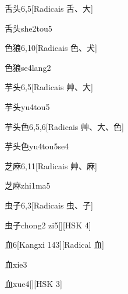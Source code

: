 \begin{entry}{舌头}{6,5}[Radicais ⾆、⼤]
  \begin{phonetics}{舌头}{she2tou5}
  \end{phonetics}
\end{entry}

\begin{entry}{色狼}{6,10}[Radicais ⾊、⽝]
  \begin{phonetics}{色狼}{se4lang2}
  \end{phonetics}
\end{entry}

\begin{entry}{芋头}{6,5}[Radicais ⾋、⼤]
  \begin{phonetics}{芋头}{yu4tou5}
  \end{phonetics}
\end{entry}

\begin{entry}{芋头色}{6,5,6}[Radicais ⾋、⼤、⾊]
  \begin{phonetics}{芋头色}{yu4tou5se4}
  \end{phonetics}
\end{entry}

\begin{entry}{芝麻}{6,11}[Radicais ⾋、⿇]
  \begin{phonetics}{芝麻}{zhi1ma5}
  \end{phonetics}
\end{entry}

\begin{entry}{虫子}{6,3}[Radicais ⾍、⼦]
  \begin{phonetics}{虫子}{chong2 zi5}[][HSK 4]
  \end{phonetics}
\end{entry}

\begin{entry}{血}{6}[Kangxi 143][Radical ⾎]
  \begin{phonetics}{血}{xie3}
  \end{phonetics}
  \begin{phonetics}{血}{xue4}[][HSK 3]
  \end{phonetics}
\end{entry}

